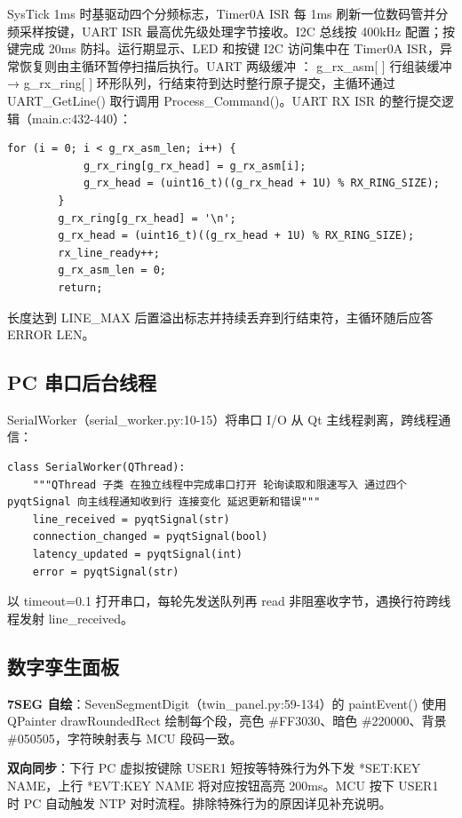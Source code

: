 \documentclass[11pt,a4paper]{article}
\begin{document}
SysTick 1ms 时基驱动四个分频标志，Timer0A ISR 每 1ms 刷新一位数码管并分频采样按键，UART ISR 最高优先级处理字节接收。I2C 总线按 400kHz 配置；按键完成 20ms 防抖。运行期显示、LED 和按键 I2C 访问集中在 Timer0A ISR，异常恢复则由主循环暂停扫描后执行。UART 两级缓冲 ： g\_rx\_asm[ ] 行组装缓冲 → g\_rx\_ring[ ] 环形队列，行结束符到达时整行原子提交，主循环通过 UART\_GetLine() 取行调用 Process\_Command()。UART RX ISR 的整行提交逻辑（main.c:432-440）：
\begin{lstlisting}[style=cstyle]
        for (i = 0; i < g_rx_asm_len; i++) {
            g_rx_ring[g_rx_head] = g_rx_asm[i];
            g_rx_head = (uint16_t)((g_rx_head + 1U) % RX_RING_SIZE);
        }
        g_rx_ring[g_rx_head] = '\n';
        g_rx_head = (uint16_t)((g_rx_head + 1U) % RX_RING_SIZE);
        rx_line_ready++;
        g_rx_asm_len = 0;
        return;
\end{lstlisting}

长度达到 LINE\_MAX 后置溢出标志并持续丢弃到行结束符，主循环随后应答 ERROR LEN。

\subsection{PC 串口后台线程}

SerialWorker（serial\_worker.py:10-15）将串口 I/O 从 Qt 主线程剥离，跨线程通信：

\begin{lstlisting}[style=pystyle]
class SerialWorker(QThread):
    """QThread 子类 在独立线程中完成串口打开 轮询读取和限速写入 通过四个 pyqtSignal 向主线程通知收到行 连接变化 延迟更新和错误"""
    line_received = pyqtSignal(str)
    connection_changed = pyqtSignal(bool)
    latency_updated = pyqtSignal(int)
    error = pyqtSignal(str)
\end{lstlisting}

以 timeout=0.1 打开串口，每轮先发送队列再 read 非阻塞收字节，遇换行符跨线程发射 line\_received。

\subsection{数字孪生面板}

\textbf{7SEG 自绘}：SevenSegmentDigit（twin\_panel.py:59-134）的 paintEvent() 使用 QPainter drawRoundedRect 绘制每个段，亮色 \#FF3030、暗色 \#220000、背景 \#050505，字符映射表与 MCU 段码一致。

\textbf{双向同步}：下行 PC 虚拟按键除 USER1 短按等特殊行为外下发 *SET:KEY NAME，上行 *EVT:KEY NAME 将对应按钮高亮 200ms。MCU 按下 USER1 时 PC 自动触发 NTP 对时流程。排除特殊行为的原因详见补充说明。
\end{document}
